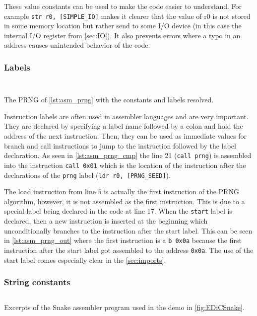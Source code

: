 These value constants can be used to make the code easier to understand.
For example \texttt{str r0, [SIMPLE_IO]} makes it clearer that the value of r0 is not stored in some memory location but rather send to some I/O device (in this case the internal I/O register from \cref{sec:IO}).
It also prevents errors where a typo in an address causes unintended behavior of the code.

\subsubsection{Labels}
\begin{listing}[t]
  \begin{multicols}{2}
    \inputminted[linenos,
      breaklines,
      frame=leftline,
      xleftmargin=20pt,
    ]{ARM}{src/prng.s}
    \inputminted[breaklines, frame=leftline]{ARM}{src/prng_cmp.s}

  \end{multicols}
  \caption{The \gls{PRNG} of \cref{lst:asm_prng} with the constants and labels resolved.}
  \label{lst:asm_prng_cmp}
\end{listing}
Instruction labels are often used in assembler languages and are very important.
They are declared by specifying a label name followed by a colon and hold the address of the next instruction.
Then, they can be used as immediate values for branch and call instructions to jump to the instruction followed by the label declaration.
As seen in \cref{lst:asm_prng_cmp} the line 21 (\texttt{call prng}) is assembled into the instruction \texttt{call 0x01} which is the location of the instruction after the declarations of the \texttt{prng} label (\texttt{ldr r0, [PRNG_SEED]}).

The load instruction from line 5 is actually the first instruction of the \gls{PRNG} algorithm, however, it is not assembled as the first instruction.
This is due to a special label being declared in the code at line 17.
When the \texttt{start} label is declared, then a new instruction is inserted at the beginning which unconditionally branches to the instruction after the start label.
This can be seen in \cref{lst:asm_prng_out} where the first instruction is a \texttt{b 0x0a} because the first instruction after the start label got assembled to the address \texttt{0x0a}.
The use of the start label comes especially clear in the \cref{sec:imports}.

\subsubsection{String constants}
\begin{listing}[t]
  \inputminted[linenos,
    breaklines,
    frame=leftline,
    xleftmargin=20pt,
  ]{ARM}{src/snake_excerpt.s}
  \caption{Excerpts of the Snake assembler program used in the demo in \cref{fig:EDiCSnake}.}
  \label{lst:asm_snake_excerpt}
\end{listing}


